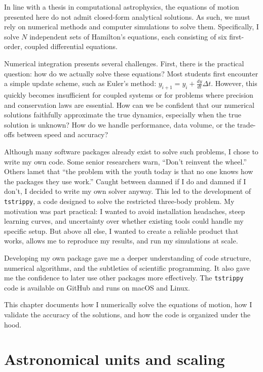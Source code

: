 In line with a thesis in computational astrophysics, the equations of motion presented here do not admit closed-form analytical solutions. As such, we must rely on numerical methods and computer simulations to solve them. Specifically, I solve $N$ independent sets of Hamilton's equations, each consisting of six first-order, coupled differential equations.

Numerical integration presents several challenges. First, there is the practical question: how do we actually solve these equations? Most students first encounter a simple update scheme, such as Euler's method: $y_{i+1} = y_i + \frac{dy}{dt}\Delta t$. However, this quickly becomes insufficient for coupled systems or for problems where precision and conservation laws are essential. How can we be confident that our numerical solutions faithfully approximate the true dynamics, especially when the true solution is unknown? How do we handle performance, data volume, or the trade-offs between speed and accuracy?

Although many software packages already exist to solve such problems, I chose to write my own code. Some senior researchers warn, ``Don't reinvent the wheel.'' Others lamet that ``the problem with the youth today is that no one knows how the packages they use work.'' Caught between damned if I do and damned if I don't, I decided to write my own solver anyway. This led to the development of \texttt{tstrippy}, a code designed to solve the restricted three-body problem. My motivation was part practical: I wanted to avoid installation headaches, steep learning curves, and uncertainty over whether existing tools could handle my specific setup. But above all else, I wanted to create a reliable product that works, allows me to reproduce my results, and run my simulations at scale. 

Developing my own package gave me a deeper understanding of code structure, numerical algorithms, and the subtleties of scientific programming. It also gave me the confidence to later use other packages more effectively. The \texttt{tstrippy} code is available on GitHub and runs on macOS and Linux.

This chapter documents how I numerically solve the equations of motion, how I validate the accuracy of the solutions, and how the code is organized under the hood.



\section{Astronomical units and scaling}

